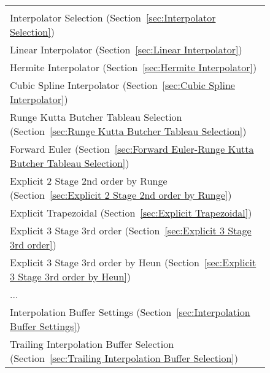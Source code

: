 \begin{figure}
\begin{tabular}{p{}}
    \index{Implicit BDF Stepper Error Weight Vector Calculator} \\ 
\hspace*{0.4in} Interpolator Selection (Section~\ref{sec:Interpolator Selection})
    \index{Interpolator Selection} \\ 
\hspace*{0.6in} Linear Interpolator (Section~\ref{sec:Linear Interpolator})
    \index{Linear Interpolator} \\ 
\hspace*{0.6in} Hermite Interpolator (Section~\ref{sec:Hermite Interpolator})
    \index{Hermite Interpolator} \\ 
\hspace*{0.6in} Cubic Spline Interpolator (Section~\ref{sec:Cubic Spline Interpolator})
    \index{Cubic Spline Interpolator} \\ 
\hspace*{0.4in} Runge Kutta Butcher Tableau Selection (Section~\ref{sec:Runge Kutta Butcher Tableau Selection})
    \index{Runge Kutta Butcher Tableau Selection} \\ 
\hspace*{0.6in} Forward Euler (Section~\ref{sec:Forward Euler-Runge Kutta Butcher Tableau Selection})
    \index{Forward Euler} \\ 
\hspace*{0.6in} Explicit 2 Stage 2nd order by Runge (Section~\ref{sec:Explicit 2 Stage 2nd order by Runge})
    \index{Explicit 2 Stage 2nd order by Runge} \\ 
\hspace*{0.6in} Explicit Trapezoidal (Section~\ref{sec:Explicit Trapezoidal})
    \index{Explicit Trapezoidal} \\ 
\hspace*{0.6in} Explicit 3 Stage 3rd order (Section~\ref{sec:Explicit 3 Stage 3rd order})
    \index{Explicit 3 Stage 3rd order} \\ 
\hspace*{0.6in} Explicit 3 Stage 3rd order by Heun (Section~\ref{sec:Explicit 3 Stage 3rd order by Heun})
    \index{Explicit 3 Stage 3rd order by Heun} \\ 
\hspace*{0.6in}  ... \\ 
\hspace*{0.2in} Interpolation Buffer Settings (Section~\ref{sec:Interpolation Buffer Settings})
    \index{Interpolation Buffer Settings} \\ 
\hspace*{0.4in} Trailing Interpolation Buffer Selection (Section~\ref{sec:Trailing Interpolation Buffer Selection})

\end{tabular}
\end{figure}
